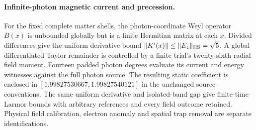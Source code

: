 \paragraph{Infinite-photon magnetic current and precession.}
For the fixed complete matter shells, the photon-coordinate Weyl operator
$B(x)$ is unbounded globally but is a finite Hermitian matrix at each $x$.
Divided differences give the uniform derivative bound
$\|K'(x)\|\leq\|E_z\|_{\rm HS}=\sqrt5$. A global differentiated Taylor
remainder is controlled by a finite trial's twenty-sixth radial field
moment. Fourteen padded photon degrees evaluate its current and energy
witnesses against the full photon source. The resulting static coefficient
is enclosed in $[1.99827530667,1.99827540121]$ in the unchanged source
conventions. The same uniform derivative and isolated-band gap give
finite-time Larmor bounds with arbitrary references and every field outcome
retained. Physical field calibration, electron anomaly and spatial trap
removal are separate identifications.
